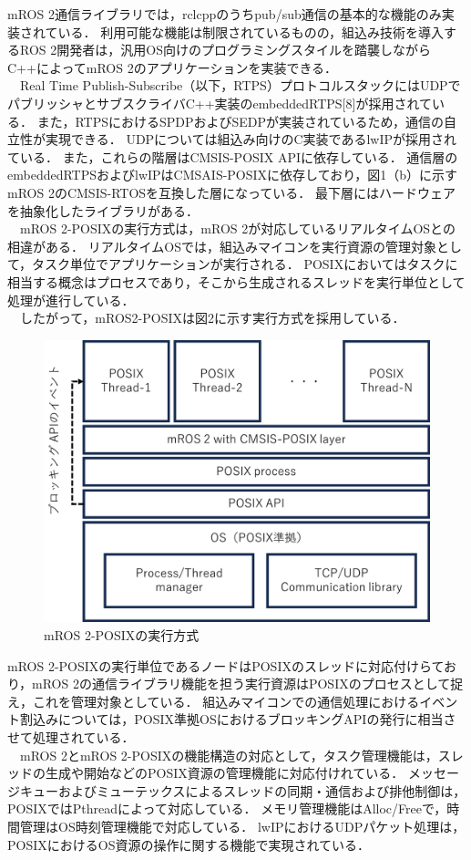 \documentclass[11pt]{ujarticle}
\begin{document}
mROS 2通信ライブラリでは，rclcppのうちpub/sub通信の基本的な機能のみ実装されている．
利用可能な機能は制限されているものの，組込み技術を導入するROS 2開発者は，汎用OS向けのプログラミングスタイルを踏襲しながらC++によってmROS 2のアプリケーションを実装できる．
\\　Real Time Publish-Subscribe（以下，RTPS）プロトコルスタックにはUDPでパブリッシャとサブスクライバC++実装のembeddedRTPS[8]が採用されている．
また，RTPSにおけるSPDPおよびSEDPが実装されているため，通信の自立性が実現できる．
UDPについては組込み向けのC実装であるlwIPが採用されている．
また，これらの階層はCMSIS-POSIX APIに依存している．
通信層のembeddedRTPSおよびlwIPはCMSAIS-POSIXに依存しており，図1（b）に示すmROS 2のCMSIS-RTOSを互換した層になっている．
最下層にはハードウェアを抽象化したライブラリがある．
\\　mROS 2-POSIXの実行方式は，mROS 2が対応しているリアルタイムOSとの相違がある．
リアルタイムOSでは，組込みマイコンを実行資源の管理対象として，タスク単位でアプリケーションが実行される．
POSIXにおいてはタスクに相当する概念はプロセスであり，そこから生成されるスレッドを実行単位として処理が進行している．
\\　したがって，mROS2-POSIXは図2に示す実行方式を採用している．
\begin{figure}[t]
	\centering
	\includegraphics[width=0.9\linewidth]{./src/fig2_execution_structure.png}
	\caption{mROS 2-POSIXの実行方式}
  \label{fig:arch}
\end{figure}
mROS 2-POSIXの実行単位であるノードはPOSIXのスレッドに対応付けらており，mROS 2の通信ライブラリ機能を担う実行資源はPOSIXのプロセスとして捉え，これを管理対象としている．
組込みマイコンでの通信処理におけるイベント割込みについては，POSIX準拠OSにおけるブロッキングAPIの発行に相当させて処理されている．
\\　mROS 2とmROS 2-POSIXの機能構造の対応として，タスク管理機能は，スレッドの生成や開始などのPOSIX資源の管理機能に対応付けれている．
メッセージキューおよびミューテックスによるスレッドの同期・通信および排他制御は，POSIXではPthreadによって対応している．
メモリ管理機能はAlloc/Freeで，時間管理はOS時刻管理機能で対応している．
lwIPにおけるUDPパケット処理は，POSIXにおけるOS資源の操作に関する機能で実現されている．
\end{document}
